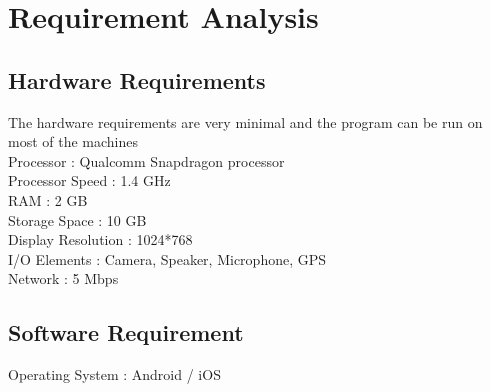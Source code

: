 \chapter{Requirement Analysis}
\section{Hardware Requirements}
The hardware requirements are very minimal and the program can be run on most 
of the machines\\
Processor : Qualcomm Snapdragon processor \\
Processor Speed : 1.4 GHz\\
RAM : 2 GB\\
Storage Space : 10 GB\\
Display Resolution : 1024*768\\
I/O Elements : Camera, Speaker, Microphone, GPS\\
Network : 5 Mbps\\
\section{Software Requirement}
Operating System : Android / iOS




